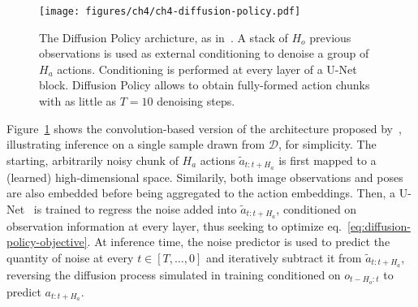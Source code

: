 \begin{figure}
    \centering
    \texttt{[image: figures/ch4/ch4-diffusion-policy.pdf]}
    \caption{The Diffusion Policy archicture, as in~\citet{chiDiffusionPolicyVisuomotor2024}. A stack of \( H_o \) previous observations is used as external conditioning to denoise a group of \( H_a \) actions. Conditioning is performed at every layer of a U-Net block. Diffusion Policy allows to obtain fully-formed action chunks with as little as \(T=10\) denoising steps.}
    \label{fig:diffusion-policy-architecture}
\end{figure}

Figure~\ref{fig:diffusion-policy-architecture} shows the convolution-based version of the architecture proposed by~\citet{chiDiffusionPolicyVisuomotor2024}, illustrating inference on a single sample drawn from \( \mathcal D \), for simplicity.
The starting, arbitrarily noisy chunk of \( H_a \) actions \(\tilde a_{t:t+H_a} \) is first mapped to a (learned) high-dimensional space.
Similarily, both image observations and poses are also embedded before being aggregated to the action embeddings.
Then, a U-Net~\citep{ronnebergerUNetConvolutionalNetworks2015} is trained to regress the noise added into \( \tilde a_{t:t+H_a} \), conditioned on observation information at every layer, thus seeking to optimize eq.~\ref{eq:diffusion-policy-objective}.
At inference time, the noise predictor is used to predict the quantity of noise at every \( t \in [T, \dots, 0 ] \) and iteratively subtract it from \(\tilde a_{t:t+H_a} \), reversing the diffusion process simulated in training conditioned on \(o_{t-H_o:t} \) to predict \(a_{t:t+H_a} \).

